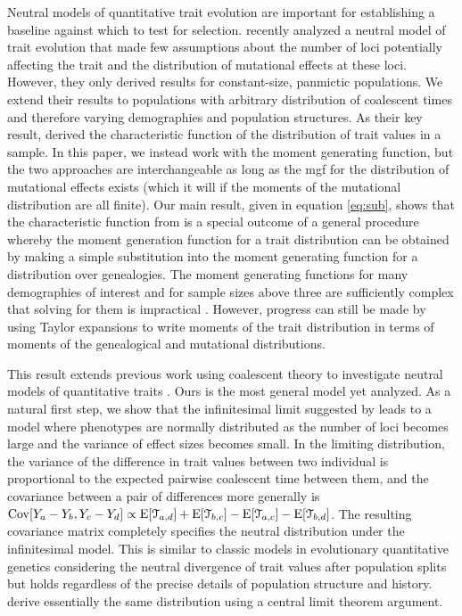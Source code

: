 Neutral models of quantitative trait evolution are important for establishing a
baseline against which to test for selection. \citet{Schraiber2015} recently
analyzed a neutral model of trait evolution that made few assumptions about the
number of loci potentially affecting the trait and the distribution of
mutational effects at these loci. However, they only derived results for
constant-size, panmictic populations. We extend their results to populations
with arbitrary distribution of coalescent times and therefore varying
demographies and population structures. As their key result,
\citet{Schraiber2015} derived the characteristic function of the distribution of
trait values in a sample. In this paper, we instead work with the moment
generating function, but the two approaches are interchangeable as long as the
mgf for the distribution of mutational effects exists (which it will if the
moments of the mutational distribution are all finite). Our main result, given
in equation \eqref{eq:sub}, shows that the characteristic function
from \citet{Schraiber2015} is a special outcome of a general procedure whereby
the moment generation function for a trait distribution can be obtained by
making a simple substitution into the moment generating function for a
distribution over genealogies. The moment generating functions for many
demographies of interest and for sample sizes above three are sufficiently
complex that solving for them is impractical \citep{Lohse2011}. However,
progress can still be made by using Taylor expansions to write moments of the
trait distribution in terms of moments of the genealogical and mutational
distributions.

This result extends previous work using coalescent theory to investigate neutral
models of quantitative traits \citep{Whitlock1999,Schraiber2015}. Ours is the
most general model yet analyzed. As a natural first step, we show that the
infinitesimal limit suggested by \citet{Fisher1918} leads to a model where
phenotypes are normally distributed as the number of loci becomes large and the
variance of effect sizes becomes small. In the limiting distribution, the
variance of the difference in trait values between two individual is
proportional to the expected pairwise coalescent time between them, and the
covariance between a pair of differences more generally is $\mathrm{Cov}[Y_a - Y_b,Y_c -
Y_d] \propto \mathrm{E}[\mathcal{T}_{a,d}] + \mathrm{E}[\mathcal{T}_{b,c}] -
\mathrm{E}[\mathcal{T}_{a,c}] - \mathrm{E}[\mathcal{T}_{b,d}]$. The resulting covariance matrix
completely specifies the neutral distribution under the infinitesimal model.
This is similar to classic models in evolutionary quantitative genetics
considering the neutral divergence of trait values after population splits
\citep{Lande1976,Lynch1989} but holds regardless of the precise details of
population structure and history. \citet{Schraiber2015} derive essentially the
same distribution using a central limit theorem argument. 


